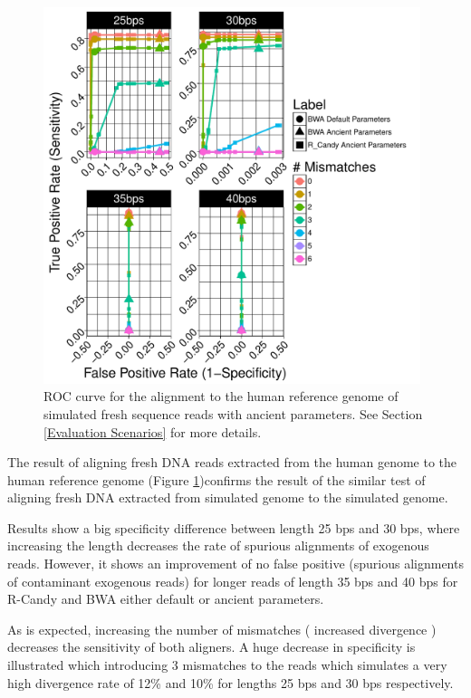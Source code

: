 \documentclass[11pt,a4paper]{report}
\begin{document}
\begin{figure}[H]
\centering
\includegraphics[width=11cm]{pictures/f_DS9_22_20_54_emp.pdf}
\caption{ 
ROC curve for the alignment to the human reference genome of simulated 
fresh sequence reads with ancient parameters. See Section \ref{Evaluation 
Scenarios} for more details.
}
\label{DS9_emp}
\end{figure}
 

The result of aligning fresh DNA reads extracted from the human genome
to the human reference genome (Figure \ref{DS9_emp})confirms the result 
of the similar test of aligning fresh DNA extracted from simulated genome 
to the simulated genome.  

 
Results show a big specificity difference between length 25 bps and 30 bps, 
where increasing the length decreases the rate of spurious alignments of
exogenous reads. However, it shows an improvement of no false positive (spurious
alignments of contaminant exogenous reads) for longer reads of length 35 bps and 
40 bps for R-Candy and BWA either default or ancient parameters. 

As is expected, increasing the number of mismatches ( increased divergence ) 
decreases the sensitivity of both aligners. A huge decrease in specificity is
illustrated which introducing 3 mismatches to the reads which simulates a very
high divergence rate of 12\% and 10\% for lengths 25 bps and 30 bps respectively.


\end{document}
